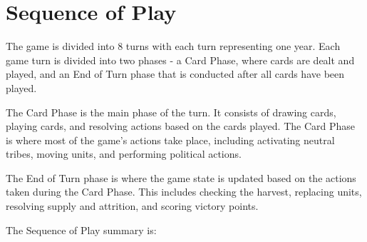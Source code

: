 \section{Sequence of Play}

The game is divided into 8 turns with each turn representing one year. Each game turn is divided into two phases - a Card Phase, where cards are dealt and played, and an End of Turn phase that is conducted after all cards have been played.

The Card Phase is the main phase of the turn. It consists of drawing cards, playing cards, and resolving actions based on the cards played. The Card Phase is where most of the game's actions take place, including activating neutral tribes, moving units, and performing political actions.

The End of Turn phase is where the game state is updated based on the actions taken during the Card Phase. This includes checking the harvest, replacing units, resolving supply and attrition, and scoring victory points.

The Sequence of Play summary is:


